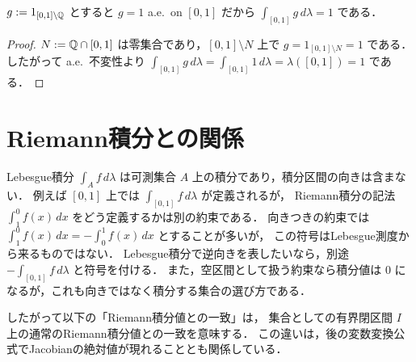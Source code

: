 \begin{example}
$g:=1_{[0,1]\setminus \mathbb Q}$ とすると $g=1$ a.e.\ on $[0,1]$ だから
$\int_{[0,1]} g\,d\lambda=1$ である．
\end{example}
\begin{proof}
$N:=\mathbb Q \cap [0,1]$ は零集合であり，$[0,1]\setminus N$ 上で $g=1_{[0,1]\setminus N}=1$ である．
したがって a.e.\ 不変性より $\int_{[0,1]} g\,d\lambda=\int_{[0,1]} 1\,d\lambda=\lambda([0,1])=1$ である．
\end{proof}

\section{Riemann積分との関係}

\begin{remark}[積分区間の向き]\label{rem:lebesgue-integral-no-orientation}
Lebesgue積分 $\int_A f\,d\lambda$ は可測集合 $A$ 上の積分であり，積分区間の向きは含まない．
例えば $[0,1]$ 上では $\int_{[0,1]} f\,d\lambda$ が定義されるが，
Riemann積分の記法 $\int_1^0 f(x)\,dx$ をどう定義するかは別の約束である．
向きつきの約束では $\int_1^0 f(x)\,dx=-\int_0^1 f(x)\,dx$ とすることが多いが，
この符号はLebesgue測度から来るものではない．
Lebesgue積分で逆向きを表したいなら，別途 $-\int_{[0,1]}f\,d\lambda$ と符号を付ける．
また，空区間として扱う約束なら積分値は $0$ になるが，これも向きではなく積分する集合の選び方である．

したがって以下の「Riemann積分値との一致」は，
集合としての有界閉区間 $I$ 上の通常のRiemann積分値との一致を意味する．
この違いは，後の変数変換公式でJacobianの絶対値が現れることとも関係している．
\end{remark}


